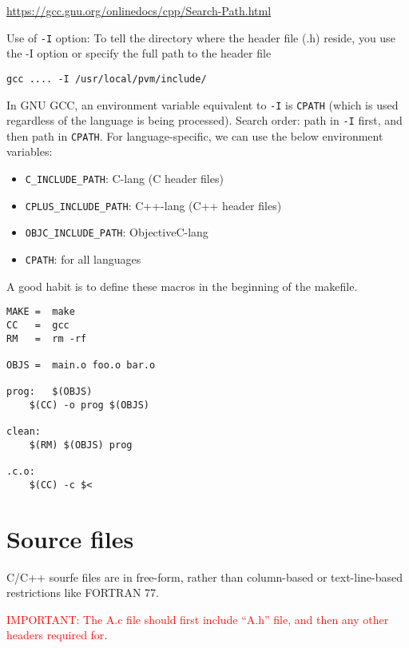 \url{https://gcc.gnu.org/onlinedocs/cpp/Search-Path.html}

Use of \verb!-I! option: To tell the directory where the header file (.h) reside, you
use the -I option or specify the full path to the header file
\begin{verbatim}
gcc .... -I /usr/local/pvm/include/
\end{verbatim}

In GNU GCC, an environment variable equivalent to \verb!-I! is 
\verb!CPATH! (which is used regardless of the language is being processed).
Search order: path in \verb!-I! first, and then path in \verb!CPATH!. For
language-specific, we can use the below environment variables:
\begin{itemize}
  \item \verb!C_INCLUDE_PATH!: C-lang (C header files) 
    
  \item \verb!CPLUS_INCLUDE_PATH!: C++-lang (C++ header files)
  
  \item \verb!OBJC_INCLUDE_PATH!: ObjectiveC-lang
  
  \item \verb!CPATH!: for all languages
\end{itemize}


A good habit is to define these macros in the beginning of the makefile.
\begin{verbatim}
MAKE =	make
CC   =	gcc
RM   =	rm -rf

OBJS =	main.o foo.o bar.o

prog:	$(OBJS)
	$(CC) -o prog $(OBJS)

clean:
	$(RM) $(OBJS) prog

.c.o:
	$(CC) -c $<
\end{verbatim}


\section{Source files}
\label{sec:source-files}

C/C++ sourfe files are in free-form, rather than column-based or text-line-based
restrictions like FORTRAN 77.

\textcolor{red}{IMPORTANT: The A.c file should first include ``A.h''
file, and then any other headers required for}.

